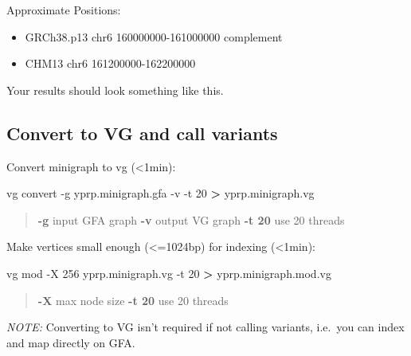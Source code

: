 \documentclass[
]{book}
\newenvironment{Shaded}{\begin{snugshade}}{\end{snugshade}}
\newcommand{\AttributeTok}[1]{\textcolor[rgb]{0.77,0.63,0.00}{#1}}
\newcommand{\ExtensionTok}[1]{#1}
\newcommand{\NormalTok}[1]{#1}
\newcommand{\OperatorTok}[1]{\textcolor[rgb]{0.81,0.36,0.00}{\textbf{#1}}}
\begin{document}
Approximate Positions:

\begin{itemize}
\item
  GRCh38.p13 chr6 160000000-161000000 complement
\item
  CHM13 chr6 161200000-162200000
\end{itemize}

Your results should look something like this.

\hypertarget{convert-to-vg-and-call-variants}{%
\subsection*{Convert to VG and call variants}\label{convert-to-vg-and-call-variants}}

Convert minigraph to vg (\textless1min):

\begin{Shaded}
\begin{Highlighting}[]
\ExtensionTok{vg}\NormalTok{ convert }\AttributeTok{{-}g}\NormalTok{ yprp.minigraph.gfa }\AttributeTok{{-}v} \AttributeTok{{-}t}\NormalTok{ 20 }\OperatorTok{\textgreater{}}\NormalTok{ yprp.minigraph.vg}
\end{Highlighting}
\end{Shaded}

\begin{quote}
\textbf{-g} input GFA graph
\textbf{-v} output VG graph
\textbf{-t 20} use 20 threads
\end{quote}

Make vertices small enough (\textless=1024bp) for indexing (\textless1min):

\begin{Shaded}
\begin{Highlighting}[]
\ExtensionTok{vg}\NormalTok{ mod }\AttributeTok{{-}X}\NormalTok{ 256 yprp.minigraph.vg }\AttributeTok{{-}t}\NormalTok{ 20 }\OperatorTok{\textgreater{}}\NormalTok{ yprp.minigraph.mod.vg}
\end{Highlighting}
\end{Shaded}

\begin{quote}
\textbf{-X} max node size
\textbf{-t 20} use 20 threads
\end{quote}

\emph{NOTE:} Converting to VG isn't required if not calling variants, i.e.~you can index and map directly on GFA.
\end{document}
